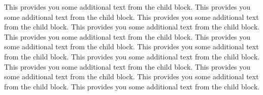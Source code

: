 
This provides you some additional text from the child block.
This provides you some additional text from the child block.
This provides you some additional text from the child block.
This provides you some additional text from the child block.
This provides you some additional text from the child block.
This provides you some additional text from the child block.
This provides you some additional text from the child block.
This provides you some additional text from the child block.
This provides you some additional text from the child block.
This provides you some additional text from the child block.
This provides you some additional text from the child block.
This provides you some additional text from the child block.
